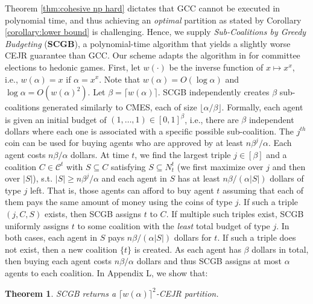 \documentclass[letterpaper]{article} %
\newtheorem{theorem}{Theorem}
\begin{document}
Theorem \ref{thm:cohesive np hard} dictates that GCC cannot be executed in polynomial time, and thus achieving an \textit{optimal} partition as stated by Corollary \ref{corollary:lower bound} is challenging. Hence, we supply \textit{Sub-Coalitions by Greedy Budgeting} (\textbf{SCGB}), a polynomial-time algorithm that yields a slightly worse CEJR guarantee than GCC. Our scheme adapts the algorithm in \cite[Section 5.3]{do2022online} for committee elections to hedonic games. First, let $w(\cdot)$ be the inverse function of $x \mapsto x^x$, i.e., $w(\alpha) = x$ if $\alpha = x^x$. Note that $w(\alpha) = O(\log \alpha)$ and $\log \alpha = O(w(\alpha)^2)$. Let $\beta = \lceil w(\alpha) \rceil$. SCGB independently creates $\beta$ sub-coalitions generated similarly to CMES, each of size $\lfloor \alpha/\beta \rfloor$. Formally, each agent is given an initial budget of $(1, \dots, 1) \in [0,1]^\beta$, i.e., there are $\beta$ independent dollars where each one is associated with a specific possible sub-coalition. The $j^{th}$ coin can be used for buying agents who are approved by at least $n \beta^j /\alpha$. Each agent costs $n \beta/\alpha$ dollars. At time $t$, we find the largest triple $j \in [\beta]$ and a coalition $C \in \mathcal{C}^t$ with $S \subseteq C$ satisfying $S \subseteq N_t^t$ (we first maximize over $j$ and then over $|S|$), s.t. $|S| \geq n \beta^j /\alpha$ and each agent in $S$ has at least $n\beta /(\alpha |S|)$ dollars of type $j$ left. That is, those agents can afford to buy agent $t$ assuming that each of them pays the same amount of money using the coins of type $j$. If such a triple $(j,C,S)$ exists, then SCGB assigns $t$ to $C$. If multiple such triples exist, SCGB uniformly assigns $t$ to some coalition with the \textit{least} total budget of type $j$. In both cases, each agent in $S$ pays $n\beta /(\alpha |S|)$ dollars for $t$. If such a triple does not exist, then a new coalition $\{t\}$ is created. As each agent has $\beta$ dollars in total, then buying each agent costs $n \beta/\alpha$ dollars and thus SCGB assigns at most $\alpha$ agents to each coalition. In Appendix L, we show that: %
\begin{theorem}
    \label{thm:scgb}
    SCGB returns a $\lceil w(\alpha) \rceil^2$-CEJR partition.
\end{theorem}
\end{document}
